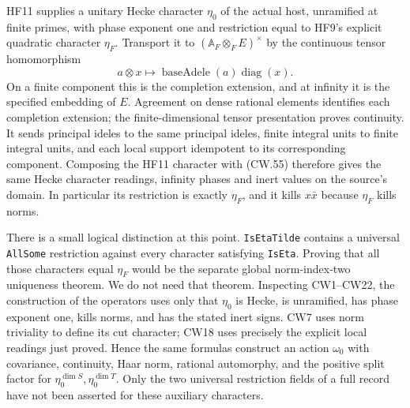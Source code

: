 HF11 supplies a unitary Hecke character $\eta_0$ of the actual
host, unramified at finite primes, with phase exponent one and
restriction equal to HF9's explicit quadratic character $\eta_F$.
Transport it to $(\mathbb A_F\otimes_F E)^\times$ by the
continuous tensor homomorphism
\[
 a\otimes x\longmapsto \operatorname{baseAdele}(a)
                                 \operatorname{diag}(x).
                                                               \tag{CW.55}
\]
On a finite component this is the completion extension, and at
infinity it is the specified embedding of $E$.  Agreement on
dense rational elements identifies each completion extension;
the finite-dimensional tensor presentation proves continuity.
It sends principal ideles to the same principal ideles, finite
integral units to finite integral units, and each local support
idempotent to its corresponding component.  Composing the HF11
character with (CW.55) therefore gives the same Hecke character
readings, infinity phases and inert values on the source's domain.
In particular its restriction is exactly $\eta_F$, and it kills
$x\bar x$ because $\eta_F$ kills norms.

There is a small logical distinction at this point.
\texttt{IsEtaTilde} contains a universal \texttt{AllSome} restriction
against every character satisfying \texttt{IsEta}.  Proving that
all those characters equal $\eta_F$ would be the separate global
norm-index-two uniqueness theorem.  We do not need that theorem.
Inspecting CW1--CW22, the construction of the operators uses only
that $\eta_0$ is Hecke, is unramified, has phase exponent one,
kills norms, and has the stated inert signs.  CW7 uses norm
triviality to define its cut character; CW18 uses precisely the
explicit local readings just proved.  Hence the same formulas
construct an action $\omega_0$ with covariance, continuity,
Haar norm, rational automorphy, and the positive split factor
for $\eta_0^{\dim S},\eta_0^{\dim T}$.  Only the two universal
restriction fields of a full record have not been asserted for
these auxiliary characters.


